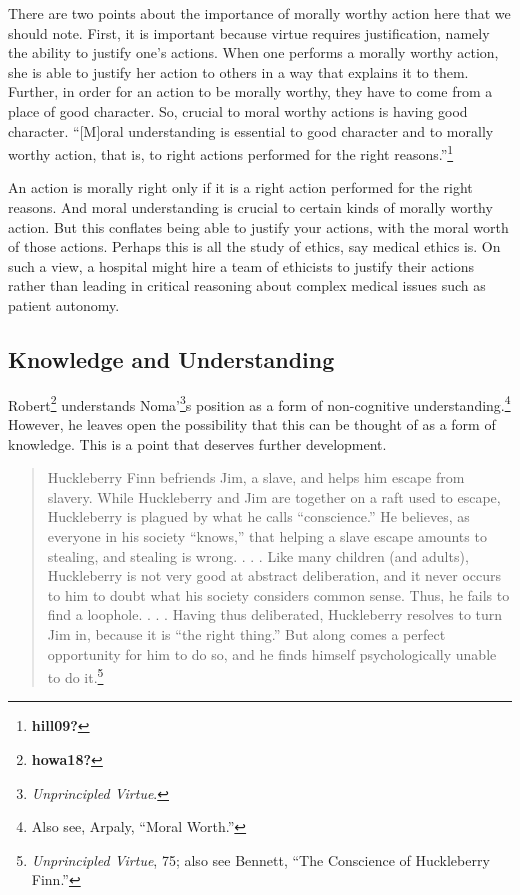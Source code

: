 \documentclass[phdthesis,12pt,final]{wuthesis}
\theoremstyle{definition}
\theoremstyle{definition}
\theoremstyle{definition}
\theoremstyle{definition}
\theoremstyle{remark}
\begin{document}
There are two points about the importance of morally worthy action here that we should note. First, it is important because virtue requires justification, namely the ability to justify one's actions. When one performs a morally worthy action, she is able to justify her action to others in a way that explains it to them. Further, in order for an action to be morally worthy, they have to come from a place of good character. So, crucial to moral worthy actions is having good character. ``{[}M{]}oral understanding is essential to good character and to morally worthy action, that is, to right actions performed for the right reasons.''\footnote{\textbf{hill09?}}

\begin{Shaded}
\begin{Highlighting}[]

\end{Highlighting}
\end{Shaded}

An action is morally right only if it is a right action performed for the right reasons. And moral understanding is crucial to certain kinds of morally worthy action. But this conflates being able to justify your actions, with the moral worth of those actions. Perhaps this is all the study of ethics, say medical ethics is. On such a view, a hospital might hire a team of ethicists to justify their actions rather than leading in critical reasoning about complex medical issues such as patient autonomy.

\subsection*{Knowledge and Understanding}\label{knowledge-and-understanding}

Robert\footnote{\textbf{howa18?}} understands Noma'\footnote{\emph{Unprincipled {Virtue}}.}s position as a form of non-cognitive understanding.\footnote{Also see, Arpaly, {``Moral {Worth}.''}} However, he leaves open the possibility that this can be thought of as a form of knowledge. This is a point that deserves further development.

\begin{quote}
Huckleberry Finn befriends Jim, a slave, and helps him escape from slavery. While Huckleberry and Jim are together on a raft used to escape, Huckleberry is plagued by what he calls ``conscience.'' He believes, as everyone in his society ``knows,'' that helping a slave escape amounts to stealing, and stealing is wrong. . . . Like many children (and adults), Huckleberry is not very good at abstract deliberation, and it never occurs to him to doubt what his society considers common sense. Thus, he fails to find a loophole. . . . Having thus deliberated, Huckleberry resolves to turn Jim in, because it is ``the right thing.'' But along comes a perfect opportunity for him to do so, and he finds himself psychologically unable to do it.\footnote{\emph{Unprincipled {Virtue}}, 75; also see Bennett, {``The {Conscience} of {Huckleberry Finn}.''}}
\end{quote}
\end{document}
